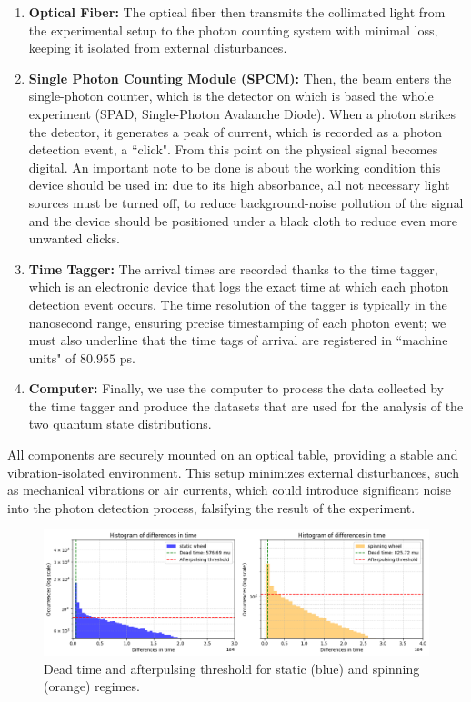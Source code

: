 \documentclass[prl,twocolumn]{revtex4-1}
\begin{document}
\begin{enumerate}
    \item \textbf{Optical Fiber:} The optical fiber then transmits the collimated light from the experimental setup to the photon counting system with minimal loss, keeping it isolated from external disturbances.
    \item \textbf{Single Photon Counting Module (SPCM):} Then, the beam enters the single-photon counter, which is the detector on which is based the whole experiment (SPAD, Single-Photon Avalanche Diode). When a photon strikes the detector, it generates a peak of current, which is recorded as a photon detection event, a ``click". From this point on the physical signal becomes digital. An important note to be done is about the working condition this device should be used in: due to its high absorbance, all not necessary light sources must be turned off, to reduce background-noise pollution of the signal and the device should be positioned under a black cloth to reduce even more unwanted clicks.
    \item \textbf{Time Tagger:} The arrival times are recorded thanks to the time tagger, which is an electronic device that logs the exact time at which each photon detection event occurs. The time resolution of the tagger is typically in the nanosecond range, ensuring precise timestamping of each photon event; we must also underline that the time tags of arrival are registered in ``machine units" of  $80.955$ ps.
    \item \textbf{Computer:} Finally, we use the computer to process the data collected by the time tagger and produce the datasets that are used for the analysis of the two quantum state distributions.
\end{enumerate}

All components are securely mounted on an optical table, providing a stable and vibration-isolated environment. This setup minimizes external disturbances, such as mechanical vibrations or air currents, which could introduce significant noise into the photon detection process, falsifying the result of the experiment.
\begin{figure}[!t]
    \centering
    \includegraphics[width=\linewidth]{Images/dead_time.png}
    \caption{Dead time and afterpulsing threshold for static (blue) and spinning (orange) regimes.}
    \label{fig:dead_time}
\end{figure}
\end{document}
